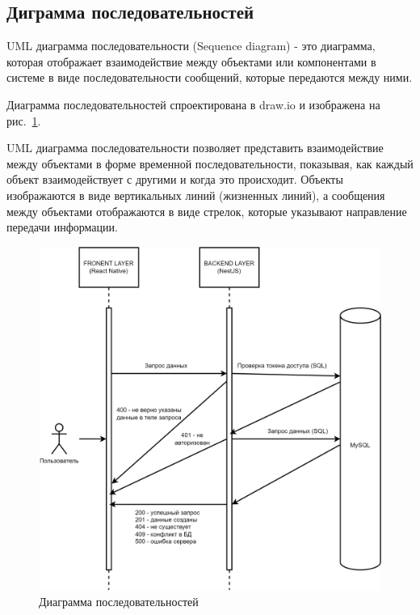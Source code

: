 \subsection*{Диграмма последовательностей}

UML диаграмма последовательности (Sequence diagram) - это диаграмма, которая отображает взаимодействие между объектами или компонентами в системе
в виде последовательности сообщений, которые передаются между ними.

Диаграмма последовательностей спроектирована в draw.io \cite{drawio} и изображена на рис.~\ref{fig:UML_sequence_diagram}.

UML диаграмма последовательности позволяет представить взаимодействие между объектами в форме временной последовательности,
показывая, как каждый объект взаимодействует с другими и когда это происходит. Объекты изображаются в виде вертикальных линий (жизненных линий),
а сообщения между объектами отображаются в виде стрелок, которые указывают направление передачи информации.

\begin{figure}[!htb]
    \centering

    \includegraphics[width=16cm]
    {images/UML/UML_sequence_diagram.png}

    \caption{Диаграмма последовательностей}

    \label{fig:UML_sequence_diagram}
\end{figure}
